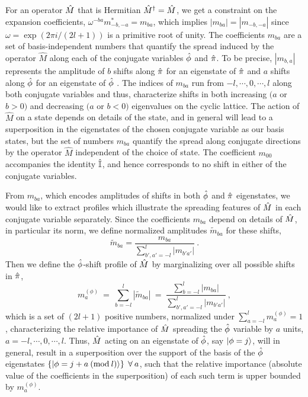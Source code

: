 \documentclass[aps,pra,onecolumn,nofootinbib,notitlepage,11pt,tightenlines]{revtex4-1}
\begin{document}
For an operator $\hat{M}$ that is Hermitian $\hat{M}^{\dag} = \hat{M}$, we get a constraint on the expansion coefficients, $\omega^{-ba} m^{*}_{-b,-a} = m_{ba}$, which implies $|m_{ba}| = |m_{-b,-a}|$ since $\omega = \exp{\left( 2 \pi i/(2l+1) \right)}$ is a primitive root of unity. 
The coefficients $m_{ba}$ are a set of basis-independent numbers that quantify the spread induced by the operator $\hat{M}$ along each of the conjugate variables $\hat{\phi}$ and $\hat{\pi}$. To be precise, $|m_{b,a}|$ represents the amplitude of $b$ shifts along $\hat{\pi}$ for an eigenstate of $\hat{\pi}$ and $a$ shifts along $\hat{\phi}$ for an eigenstate of $\hat{\phi}$ . The indices of $m_{ba}$ run from $-l, \cdots, 0, \cdots, l$ along both conjugate variables and thus, characterize shifts in both increasing $(a$ or  $b > 0)$ and decreasing $(a$ or  $b < 0)$ eigenvalues on the cyclic lattice. The action of $\hat{M}$ on a state depends on details of the state, and in general will lead to a superposition in the eigenstates of the chosen conjugate variable as our basis states, but the set of numbers $m_{ba}$ quantify the spread along conjugate directions by the operator $\hat{M}$ independent of the choice of state. The coefficient $m_{00}$ accompanies the identity $\hat{\mathbb{I}}$, and hence corresponds to no shift in either of the conjugate variables. 

From $m_{ba}$, which encodes amplitudes of shifts in both $\hat{\phi}$ and $\hat{\pi}$ eigenstates, we would like to extract profiles which illustrate the spreading features of $\hat{M}$ in each conjugate variable {separately}. Since the coefficients $m_{ba}$ depend on details of $\hat{M}$, in particular its norm, we define normalized amplitudes $\tilde{m}_{ba}$ for these shifts,
\begin{equation}
\label{mba_norm}
\tilde{m}_{ba} = \frac{m_{ba}}{\sum_{b',a' = -l}^{l} |m_{b'a'}|} \: .
\end{equation}
Then we define the {$\hat{\phi}$-shift profile} of $\hat{M}$ by marginalizing over all possible shifts in $\hat{\pi}$,
\begin{equation}
\label{ushiftham}
m^{(\phi)}_{a} \: = \: \sum_{b = -l}^{l} |\tilde{m}_{ba}| \: = \: \frac{\sum_{b = -l}^{l} |m_{ba}|}{\sum_{b',a' = -l}^{l} |m_{b'a'}|}  \: ,
\end{equation}
which is a set of $(2l+1)$ positive numbers, normalized under $\sum_{a=-l}^{l} m^{(\phi)}_{a} = 1$, characterizing the relative importance of $\hat{M}$ spreading the $\hat{\phi}$ variable by $a$ units, $a = -l,\cdots,0,\cdots,l$. Thus, $\hat{M}$ acting on an eigenstate of  $\hat{\phi}$, say $\ket{\phi = j}$, will in general, result in a superposition over the support of the basis of the $\hat{\phi}$ eigenstates $\{ \ket{\phi = j + a \: (\mathrm{mod} \: l)} \}  \: \: \forall \: a$, such that the relative importance (absolute value of the coefficients in the superposition) of each such term is upper bounded by $m^{(\phi)}_{a}$. 
 
\end{document}
